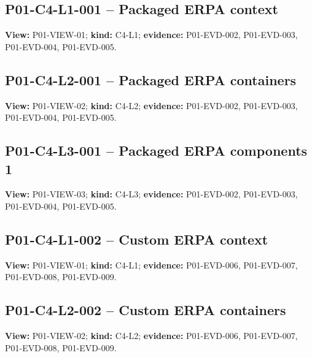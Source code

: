 \documentclass[10pt,letterpaper]{article}
\begin{document}
\subsection{P01-C4-L1-001 -- Packaged ERPA context}
\textbf{View:} P01-VIEW-01; \textbf{kind:} C4-L1; \textbf{evidence:} P01-EVD-002, P01-EVD-003, P01-EVD-004, P01-EVD-005.\par
{}
\clearpage

\subsection{P01-C4-L2-001 -- Packaged ERPA containers}
\textbf{View:} P01-VIEW-02; \textbf{kind:} C4-L2; \textbf{evidence:} P01-EVD-002, P01-EVD-003, P01-EVD-004, P01-EVD-005.\par
{}
\clearpage

\subsection{P01-C4-L3-001 -- Packaged ERPA components 1}
\textbf{View:} P01-VIEW-03; \textbf{kind:} C4-L3; \textbf{evidence:} P01-EVD-002, P01-EVD-003, P01-EVD-004, P01-EVD-005.\par
{}
\clearpage

\subsection{P01-C4-L1-002 -- Custom ERPA context}
\textbf{View:} P01-VIEW-01; \textbf{kind:} C4-L1; \textbf{evidence:} P01-EVD-006, P01-EVD-007, P01-EVD-008, P01-EVD-009.\par
{}
\clearpage

\subsection{P01-C4-L2-002 -- Custom ERPA containers}
\textbf{View:} P01-VIEW-02; \textbf{kind:} C4-L2; \textbf{evidence:} P01-EVD-006, P01-EVD-007, P01-EVD-008, P01-EVD-009.\par
{}
\clearpage
\end{document}
